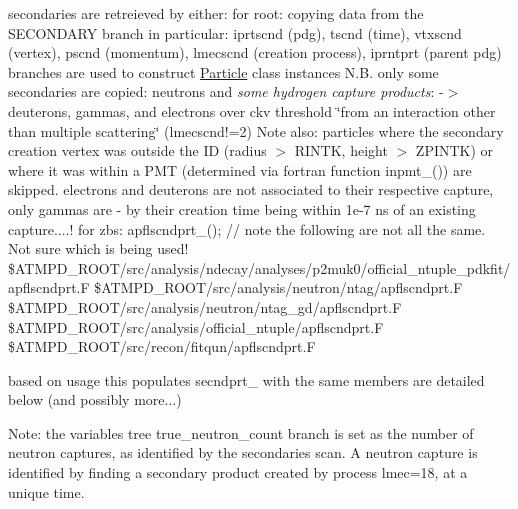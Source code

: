 secondaries are retreieved by either\+: for root\+: copying data from the SECONDARY branch in particular\+: iprtscnd (pdg), tscnd (time), vtxscnd (vertex), pscnd (momentum), lmecscnd (creation process), iprntprt (parent pdg) branches are used to construct \mbox{\hyperlink{classParticle}{Particle}} class instances N.\+B. only some secondaries are copied\+: neutrons and {\itshape some hydrogen capture products}\+: -\/$>$ deuterons, gammas, and electrons over ckv threshold \char`\"{}from an interaction other than multiple scattering\char`\"{} (lmecscnd!=2) Note also\+: particles where the secondary creation vertex was outside the ID (radius $>$ RINTK, height $>$ ZPINTK) or where it was within a PMT (determined via fortran function inpmt\+\_\+()) are skipped. electrons and deuterons are not associated to their respective capture, only gammas are -\/ by their creation time being within 1e-\/7 ns of an existing capture....! for zbs\+: apflscndprt\+\_\+(); // note the following are not all the same. Not sure which is being used! \$\+ATMPD\+\_\+\+ROOT/src/analysis/ndecay/analyses/p2muk0/official\+\_\+ntuple\+\_\+pdkfit/apflscndprt.F \$\+ATMPD\+\_\+\+ROOT/src/analysis/neutron/ntag/apflscndprt.F \$\+ATMPD\+\_\+\+ROOT/src/analysis/neutron/ntag\+\_\+gd/apflscndprt.F \$\+ATMPD\+\_\+\+ROOT/src/analysis/official\+\_\+ntuple/apflscndprt.F \$\+ATMPD\+\_\+\+ROOT/src/recon/fitqun/apflscndprt.F

based on usage this populates secndprt\+\_\+ with the same members are detailed below (and possibly more...)

Note\+: the \textquotesingle{}variables\textquotesingle{} tree \textquotesingle{}true\+\_\+neutron\+\_\+count\textquotesingle{} branch is set as the number of neutron captures, as identified by the secondaries scan. A neutron capture is identified by finding a secondary product created by process lmec=18, at a unique time. 